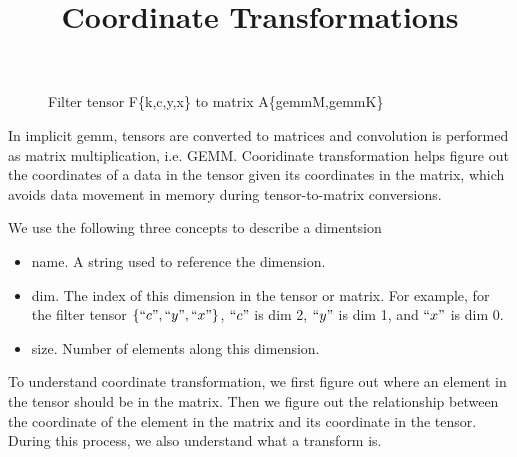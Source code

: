 



\title{Coordinate Transformations}

\maketitle


{}
\begin{figure}[!h]
  \centering
  \caption{Filter tensor F\{k,c,y,x\} to matrix A\{gemmM,gemmK\}}
  \label{fig:filter_tensor_to_matrix_A}
\end{figure}

In implicit gemm, tensors are converted to matrices and convolution
is performed as matrix multiplication, i.e. GEMM.
Cooridinate transformation helps figure out the coordinates of a data in the
tensor given its coordinates in the matrix, which avoids data movement in memory
during tensor-to-matrix conversions.

We use the following three concepts to describe a dimentsion
\begin{itemize}
\item name. A string used to reference the dimension.
\item dim. The index of this dimension in the tensor or matrix.
  For example, for the filter tensor $\{``c",``y",``x"\}$,
  $``c"$ is dim 2, $``y"$ is dim 1, and $``x"$ is dim 0.
\item size. Number of elements along this dimension.
\end{itemize}

To understand coordinate transformation, we first figure out where an element
in the tensor should be in the matrix.
Then we figure out the relationship between the coordinate of the element in the
matrix and its coordinate in the tensor.
During this process, we also understand what a transform is.

